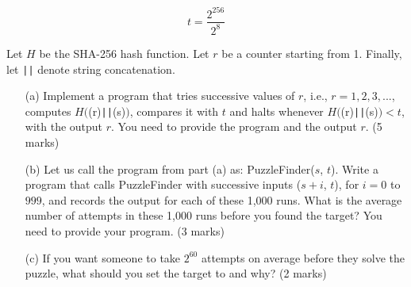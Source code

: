 \documentclass{article}
\begin{document}
\begin{equation*}
t = \frac{2^{256}}{2^8}
\end{equation*}

Let $H$ be the SHA-256 hash function. Let $r$ be a counter starting from 1. Finally, let \verb!||! denote string concatenation.

\begin{itemize}
    \item[(a)] Implement a program that tries successive values of $r$, i.e., $r = 1,2,3,...$, computes $H($(r)\verb!||!(s)$)$, compares it with $t$ and halts whenever $H($(r)\verb!||!(s)$) < t$, with the output $r$. You need to provide the program and the output $r$. (5 marks)
    \item[(b)] Let us call the program from part (a) as: PuzzleFinder($s$, $t$). Write a program that calls PuzzleFinder with successive inputs ($s + i$, $t$), for $i = 0$ to $999$, and records the output for each of these 1,000 runs. What is the average number of attempts in these 1,000 runs before you found the target? You need to provide your program. (3 marks)
    \item[(c)] If you want someone to take $2^{60}$ attempts on average before they solve the puzzle, what should you set the target to and why? (2 marks)
\end{itemize}
\end{document}
